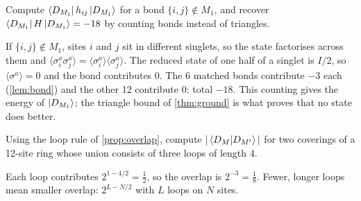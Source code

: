 \begin{exer}
  Compute $\bra{D_{M_1}}h_{ij}\ket{D_{M_1}}$ for a bond $\{i,j\}\notin M_1$, and recover
  $\bra{D_{M_1}}H\ket{D_{M_1}}=-18$ by counting bonds instead of triangles.
\end{exer}
\begin{sol}
  If $\{i,j\}\notin M_1$, sites $i$ and $j$ sit in different singlets, so the state factorises
  across them and $\langle\sigma^a_i\sigma^a_j\rangle=\langle\sigma^a_i\rangle\langle\sigma^a_j\rangle$.
  The reduced state of one half of a singlet is $I/2$, so $\langle\sigma^a\rangle=0$ and the bond
  contributes $0$. The 6 matched bonds contribute $-3$ each (\cref{lem:bond}) and the other 12
  contribute $0$: total $-18$. This counting gives the energy of $\ket{D_{M_1}}$; the triangle
  bound of \cref{thm:ground} is what proves that no state does better.
\end{sol}

\begin{prob}
  Using the loop rule of \cref{prop:overlap}, compute $|\braket{D_{M}}{D_{M'}}|$ for two
  coverings of a 12-site ring whose union consists of three loops of length 4.
\end{prob}
\begin{sol}
  Each loop contributes $2^{1-4/2}=\tfrac12$, so the overlap is $2^{-3}=\tfrac18$. Fewer, longer
  loops mean smaller overlap: $2^{L-N/2}$ with $L$ loops on $N$ sites.
\end{sol}
